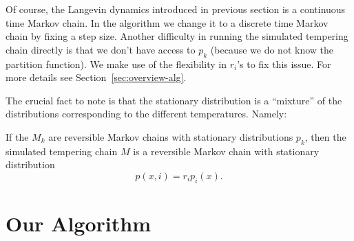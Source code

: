 Of course, the Langevin dynamics introduced in previous section is a continuous time Markov chain. In the algorithm we change it to a discrete time Markov chain by fixing a step size. Another difficulty in running the simulated tempering chain directly is that we don't have access to $p_k$ (because we do not know the partition function). We make use of the flexibility in $r_i$'s to fix this issue. For more details see Section~\ref{sec:overview-alg}.


The crucial fact to note is that the stationary distribution is a ``mixture'' of the distributions corresponding to the different temperatures. Namely:  

\begin{pr} [folklore]
If the $M_{k}$ are reversible Markov chains with stationary distributions $p_k$, then the simulated tempering chain $M$
is a reversible Markov chain with stationary distribution
$$
p(x,i) = r_ip_i(x).
$$
\end{pr}



\section{Our Algorithm} 





